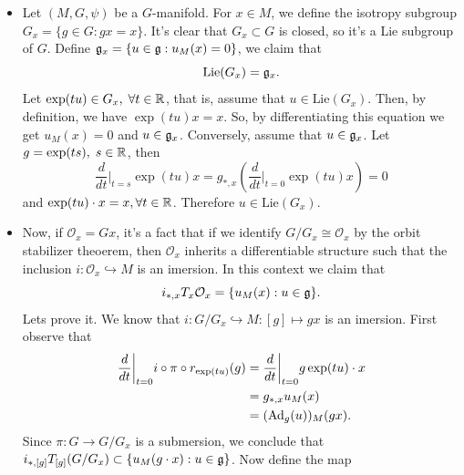 \begin{itemize}
        Now we have 
        \begin{equation}
            g_*u_M=g_*F_*u_{\overline{M}}=F_*g_*u_{\overline{M}}=F_*(\Ad_g(u))_{\overline{M}}=(\Ad_g(u))_M.
        \end{equation}
        \item Let $(M,G,\psi)$ be a $G$-manifold. For $x\in M$, we define the isotropy subgroup 
        $G_x=\{g\in G:gx=x\}$. It's clear that $G_x\subset G$ is closed, so it's a Lie subgroup of $G$. Define 
        $\mathfrak{g}_x=\{u\in\mathfrak{g}:u_M(x)=0\}$, we claim that  
        \begin{equation}
            \text{Lie}(G_x)=\mathfrak{g}_x.
        \end{equation}
        Let $\exp(tu)\in G_x,\;\forall t\in\mathbb{R}$, that is, assume that $u\in\text{Lie}(G_x)$. Then, by definition, we have 
        $\exp(tu)x=x$. So, by differentiating this equation we get $u_M(x)=0$ and $u\in\mathfrak{g}_x$. Conversely, assume that 
        $u\in\mathfrak{g}_x$. Let $g=\exp(ts),\;s\in\mathbb{R}$, then 
        \begin{equation}
            \frac{d}{dt}\bigg|_{t=s}\exp(tu)x= g_{*,x}(\frac{d}{dt}\bigg|_{t=0}\exp(tu)x)=0
        \end{equation}
        and $\exp(tu)\cdot x = x,\forall t\in\mathbb{R}$. Therefore $u\in\text{Lie}(G_x)$.
        \item Now, if $\mathcal{O}_x=Gx$, it's a fact that if we identify $G/G_x\cong \mathcal{O}_x$ by the 
        orbit stabilizer theoerem, then $\mathcal{O}_x$ inherits a differentiable structure such that the inclusion 
        $i:\mathcal{O}_x\hookrightarrow M$ is an imersion. In this context we claim that 
        \begin{equation}
            i_{*,x}T_x\mathcal{O}_x=\{u_M(x): u\in\mathfrak{g}\}.
        \end{equation}
        Lets prove it. We know that $i:G/G_x\hookrightarrow M:[g]\mapsto gx$ is an imersion. First observe that 
        \begin{equation}
            \begin{split}
                \frac{d}{dt}\bigg|_{t=0}i\circ\pi\circ r_{\exp(tu)}(g)&=\frac{d}{dt}\bigg|_{t=0}g\exp(tu)\cdot x\\
                &=g_{*,x}u_M(x)\\
                &=(\text{Ad}_g(u))_M(gx).
            \end{split}
        \end{equation}
        Since $\pi:G\rightarrow G/G_x$ is a submersion, we conclude that 
        $i_{*,[g]}T_{[g]}(G/G_x)\subset \{u_M(g\cdot x):u\in\mathfrak{g}\}$. Now define the map 

\end{itemize}
